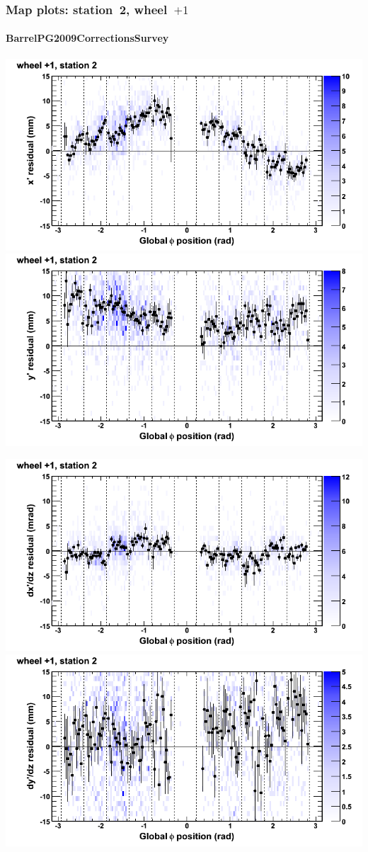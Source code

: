 \documentclass[compress]{beamer}
\begin{document}
\begin{frame}
\frametitle{Map plots: station~2, wheel~$+1$}
\framesubtitle{BarrelPG2009CorrectionsSurvey}
\includegraphics[width=0.5\linewidth]{mapplots_01/DTvsphi_st2whD_x.png}
\includegraphics[width=0.5\linewidth]{mapplots_01/DTvsphi_st2whD_y.png}

\includegraphics[width=0.5\linewidth]{mapplots_01/DTvsphi_st2whD_dxdz.png}
\includegraphics[width=0.5\linewidth]{mapplots_01/DTvsphi_st2whD_dydz.png}
\end{frame}
\end{document}
